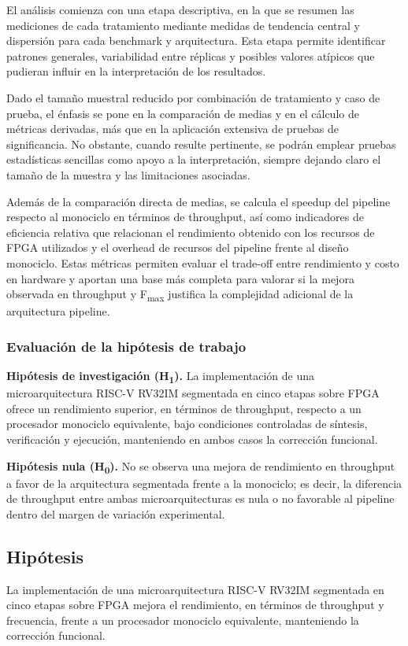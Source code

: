El análisis comienza con una etapa descriptiva, en la que se resumen las mediciones de cada tratamiento mediante medidas de tendencia central y dispersión para cada benchmark y arquitectura. Esta etapa permite identificar patrones generales, variabilidad entre réplicas y posibles valores atípicos que pudieran influir en la interpretación de los resultados.

Dado el tamaño muestral reducido por combinación de tratamiento y caso de prueba, el énfasis se pone en la comparación de medias y en el cálculo de métricas derivadas, más que en la aplicación extensiva de pruebas de significancia. No obstante, cuando resulte pertinente, se podrán emplear pruebas estadísticas sencillas como apoyo a la interpretación, siempre dejando claro el tamaño de la muestra y las limitaciones asociadas.

Además de la comparación directa de medias, se calcula el speedup del pipeline respecto al monociclo en términos de throughput, así como indicadores de eficiencia relativa que relacionan el rendimiento obtenido con los recursos de FPGA utilizados y el overhead de recursos del pipeline frente al diseño monociclo. Estas métricas permiten evaluar el trade-off entre rendimiento y costo en hardware y aportan una base más completa para valorar si la mejora observada en throughput y F\textsubscript{max} justifica la complejidad adicional de la arquitectura pipeline.

\subsubsection{Evaluación de la hipótesis de trabajo}

\textbf{Hipótesis de investigación (H\textsubscript{1}).} La implementación de una microarquitectura RISC-V RV32IM segmentada en cinco etapas sobre FPGA ofrece un rendimiento superior, en términos de throughput, respecto a un procesador monociclo equivalente, bajo condiciones controladas de síntesis, verificación y ejecución, manteniendo en ambos casos la corrección funcional.

\textbf{Hipótesis nula (H\textsubscript{0}).} No se observa una mejora de rendimiento en throughput a favor de la arquitectura segmentada frente a la monociclo; es decir, la diferencia de throughput entre ambas microarquitecturas es nula o no favorable al pipeline dentro del margen de variación experimental.

\subsection{Hipótesis}
La implementación de una microarquitectura RISC-V RV32IM segmentada en cinco etapas sobre FPGA mejora el rendimiento, en términos de throughput y frecuencia, frente a un procesador monociclo equivalente, manteniendo la corrección funcional.

